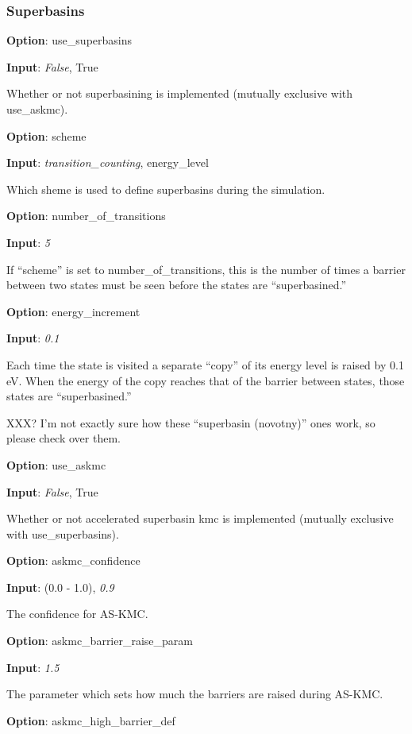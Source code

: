 \documentclass{article}
\begin{document}
\subsubsection{Superbasins}

\noindent\textbf{Option}:  use\_superbasins

\noindent\textbf{Input}:  \emph{False}, True

Whether or not superbasining is implemented (mutually exclusive with use\_askmc).

\noindent\textbf{Option}:  scheme

\noindent\textbf{Input}:  \emph{transition\_counting}, energy\_level

Which sheme is used to define superbasins during the simulation.

\noindent\textbf{Option}:  number\_of\_transitions

\noindent\textbf{Input}:  \emph{5}

If ``scheme'' is set to number\_of\_transitions, this is the number of times a barrier between two states must be seen before the states are ``superbasined.''

\noindent\textbf{Option}:  energy\_increment

\noindent\textbf{Input}:  \emph{0.1}

Each time the state is visited a separate ``copy'' of its energy level is raised by 0.1 eV.  When the energy of the copy reaches that of the barrier between states, those states are ``superbasined.''

XXX?  I'm not exactly sure how these ``superbasin (novotny)'' ones work, so please check over them.

\noindent\textbf{Option}:  use\_askmc

\noindent\textbf{Input}:  \emph{False}, True

Whether or not accelerated superbasin kmc is implemented (mutually exclusive with use\_superbasins).

\noindent\textbf{Option}:  askmc\_confidence

\noindent\textbf{Input}:  (0.0 - 1.0), \emph{0.9}

The confidence for AS-KMC.

\noindent\textbf{Option}:  askmc\_barrier\_raise\_param

\noindent\textbf{Input}:  \emph{1.5}

The parameter which sets how much the barriers are raised during AS-KMC.

\noindent\textbf{Option}:  askmc\_high\_barrier\_def
\end{document}
